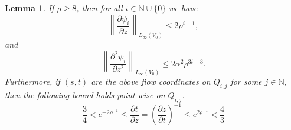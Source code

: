 \documentclass[11pt,reqno]{amsart}
\newcommand{\N}{\mathbb{N}}
\newcommand{\0}{\mathbf{0}}
\renewcommand{\1}{\mathbf 1}
\renewcommand{\ge}{\geqslant}
\renewcommand{\le}{\leqslant}
\newtheorem{lemma}[thm]{Lemma}
\theoremstyle{remark}
\newcommand{\pd}[2]{\frac{\partial #2}{\partial #1}}
\begin{document}
\begin{lemma}\label{lem:derivs of h}
  If $\rho\ge 8$, then for all $i\in \N\cup \{0\}$ we have
  \begin{equation}
    \label{eq:dhi/dz}
    \left\|\frac{\partial \psi_{i}}{\partial z}\right\|_{L_\infty(V_0)} \le 2\rho^{i-1},
    \end{equation}
    and
    \begin{equation}
    \label{eq:d2hi/dz2}
    \left\|\frac{\partial^2 \psi_{i}}{\partial z^2}\right\|_{L_\infty(V_0)} \le 2\alpha^2\rho^{3i-3}.
  \end{equation}
 Furthermore, if $(s,t)$ are the above flow coordinates on $Q_{i,j}$ for some $j\in \N$, then the following bound holds point-wise on $Q_{i,j}$.
  \begin{equation}
    \label{eq:dz/dt}
    \frac{3}{4}< e^{-2\rho^{-1}} \le \pd{z}{t}=\left(\pd{t}{z}\right)^{-1}\le e^{2\rho^{-1}}< \frac{4}{3}
  \end{equation}
\end{lemma}
\end{document}

